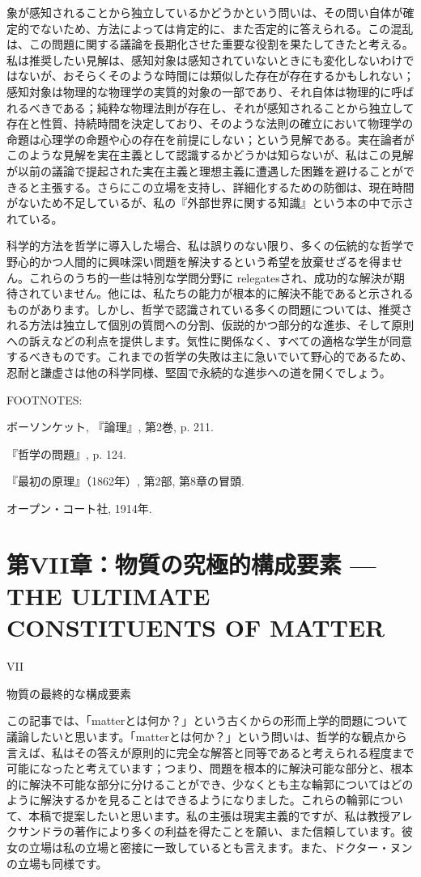 \documentclass[a4paper,11pt,openany]{ltjsbook}
\begin{document}
象が感知されることから独立しているかどうかという問いは、その問い自体が確定的でないため、方法によっては肯定的に、また否定的に答えられる。この混乱は、この問題に関する議論を長期化させた重要な役割を果たしてきたと考える。私は推奨したい見解は、感知対象は感知されていないときにも変化しないわけではないが、おそらくそのような時間には類似した存在が存在するかもしれない；感知対象は物理的な物理学の実質的対象の一部であり、それ自体は物理的に呼ばれるべきである；純粋な物理法則が存在し、それが感知されることから独立して存在と性質、持続時間を決定しており、そのような法則の確立において物理学の命題は心理学の命題や心の存在を前提にしない；という見解である。実在論者がこのような見解を実在主義として認識するかどうかは知らないが、私はこの見解が以前の議論で提起された実在主義と理想主義に遭遇した困難を避けることができると主張する。さらにこの立場を支持し、詳細化するための防御は、現在時間がないため不足しているが、私の『外部世界に関する知識』という本の中で示されている。

科学的方法を哲学に導入した場合、私は誤りのない限り、多くの伝統的な哲学で野心的かつ人間的に興味深い問題を解決するという希望を放棄せざるを得ません。これらのうち的一些は特別な学問分野に relegatesされ、成功的な解決が期待されていません。他には、私たちの能力が根本的に解決不能であると示されるものがあります。しかし、哲学で認識されている多くの問題については、推奨される方法は独立して個別の質問への分割、仮説的かつ部分的な進歩、そして原則への訴えなどの利点を提供します。気性に関係なく、すべての適格な学生が同意するべきものです。これまでの哲学の失敗は主に急いでいて野心的であるため、忍耐と謙虚さは他の科学同様、堅固で永続的な進歩への道を開くでしょう。

FOOTNOTES:

 ボーソンケット, 『論理』, 第2巻, p. 211.

 『哲学の問題』, p. 124.

 『最初の原理』（1862年）, 第2部, 第8章の冒頭.

 オープン・コート社, 1914年.


\chapter{第VII章：物質の究極的構成要素 --- {THE ULTIMATE CONSTITUENTS OF MATTER}}

VII

物質の最終的な構成要素


この記事では、「matterとは何か？」という古くからの形而上学的問題について議論したいと思います。「matterとは何か？」という問いは、哲学的な観点から言えば、私はその答えが原則的に完全な解答と同等であると考えられる程度まで可能になったと考えています；つまり、問題を根本的に解決可能な部分と、根本的に解決不可能な部分に分けることができ、少なくとも主な輪郭についてはどのように解決するかを見ることはできるようになりました。これらの輪郭について、本稿で提案したいと思います。私の主張は現実主義的ですが、私は教授アレクサンドラの著作により多くの利益を得たことを願い、また信頼しています。彼女の立場は私の立場と密接に一致しているとも言えます。また、ドクター・ヌンの立場も同様です。
\end{document}
